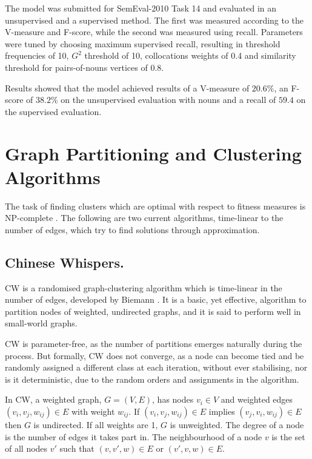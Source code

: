 The model was submitted for SemEval-2010 Task 14 \cite{manandhar2009semeval}
and evaluated in an unsupervised and a supervised method. The first was measured
according to the V-measure and F-score, while the second was measured using
recall. Parameters were tuned by choosing maximum supervised recall, resulting
in threshold frequencies of 10, $G^2$ threshold of 10, collocations weights of
0.4 and similarity threshold for pairs-of-nouns vertices of 0.8.

Results showed that the model achieved results of a V-measure of $20.6\%$, an
F-score of $38.2\%$ on the unsupervised evaluation with nouns and a recall of
$59.4$ on the supervised evaluation.

\section{Graph Partitioning and Clustering Algorithms}

The task of finding clusters which are optimal with respect to fitness measures
is NP-complete \cite{sima2006np}. The following are two current algorithms,
time-linear to the number of edges, which try to find solutions through
approximation.

\subsection{Chinese Whispers.}
\label{sec:cw}

\ac{CW} is a randomised graph-clustering algorithm which is time-linear in the
number of edges, developed by Biemann \cite{biemann2006chinese}. It is a basic,
yet effective, algorithm to partition nodes of weighted, undirected graphs, and
it is said to perform well in small-world graphs.

\ac{CW} is parameter-free, as the number of partitions emerges naturally during
the process. But formally, \ac{CW} does not converge, as a node can become tied
and be randomly assigned a different class at each iteration, without ever
stabilising, nor is it deterministic, due to the random orders and assignments
in the algorithm.

In \ac{CW}, a weighted graph, $G=(V,E)$, has nodes $v_i \in V$ and weighted
edges $(v_i, v_j, w_{ij}) \in E$ with weight $w_{ij}$. If $(v_i, v_j, w_{ij})
\in E$ implies $(v_j, v_i, w_{ij}) \in E$ then $G$ is undirected. If all weights
are 1, $G$ is unweighted. The degree of a node is the number of edges it takes
part in. The neighbourhood of a node $v$ is the set of all nodes $v'$ such that
$(v,v',w) \in E$ or $(v',v,w) \in E$.

